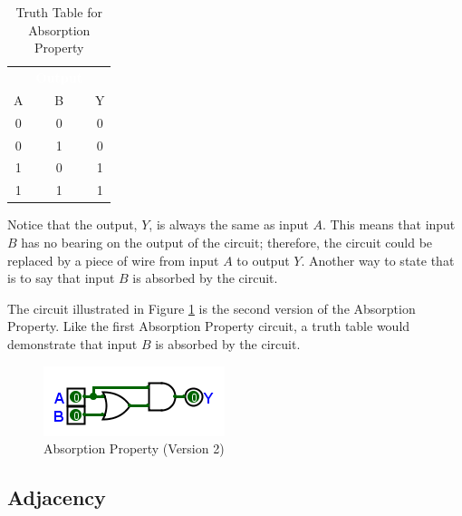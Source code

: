 \begin{table}[H]
  \sffamily
  \newcommand{\head}[1]{\textcolor{white}{\textbf{#1}}}    
  \begin{center}
    \begin{tabular}{ccc} 
      \rowcolor{black!75}
      \multicolumn{2}{c}{\head{Inputs}} & \head{Output} \\
      A & B & Y \\
      \hline
      0 & 0 & 0 \\
      0 & 1 & 0 \\
      1 & 0 & 1 \\
      1 & 1 & 1 
    \end{tabular}
  \end{center}
  \caption{Truth Table for Absorption Property}
  \label{BF:tab:truth_table_for_absorption_property_version_1}
\end{table}

Notice that the output, $ Y $, is always the same as input $ A $. This means that input $ B $ has no bearing on the output of the circuit; therefore, the circuit could be replaced by a piece of wire from input $ A $ to output $ Y $. Another way to state that is to say that input $ B $ is absorbed by the circuit.

The circuit illustrated in Figure \ref{fig:04_26} is the second version of the Absorption Property. Like the first Absorption Property circuit, a truth table would demonstrate that input $ B $ is absorbed by the circuit. 

\begin{figure}[H]
	\centering
	\includegraphics[width=\maxwidth{.95\linewidth}]{gfx/04_26}
	\caption{Absorption Property (Version 2)}
	\label{fig:04_26}
\end{figure}

\subsection{Adjacency}
\label{BF:subsec:adjacency_property}

